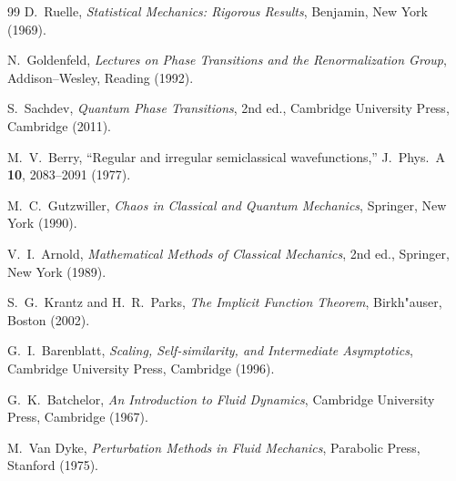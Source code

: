 \begin{thebibliography}{99}
D.~Ruelle,
\emph{Statistical Mechanics: Rigorous Results},
Benjamin, New York (1969).

N.~Goldenfeld,
\emph{Lectures on Phase Transitions and the Renormalization Group},
Addison--Wesley, Reading (1992).

S.~Sachdev,
\emph{Quantum Phase Transitions},
2nd ed., Cambridge University Press, Cambridge (2011).

M.~V.~Berry,
``Regular and irregular semiclassical wavefunctions,''
J.\ Phys.\ A \textbf{10}, 2083--2091 (1977).

M.~C.~Gutzwiller,
\emph{Chaos in Classical and Quantum Mechanics},
Springer, New York (1990).

V.~I.~Arnold,
\emph{Mathematical Methods of Classical Mechanics},
2nd ed., Springer, New York (1989).

S.~G.~Krantz and H.~R.~Parks,
\emph{The Implicit Function Theorem},
Birkh"auser, Boston (2002).

G.~I.~Barenblatt,
\emph{Scaling, Self-similarity, and Intermediate Asymptotics},
Cambridge University Press, Cambridge (1996).

G.~K.~Batchelor,
\emph{An Introduction to Fluid Dynamics},
Cambridge University Press, Cambridge (1967).

M.~Van Dyke,
\emph{Perturbation Methods in Fluid Mechanics},
Parabolic Press, Stanford (1975).

\end{thebibliography}

